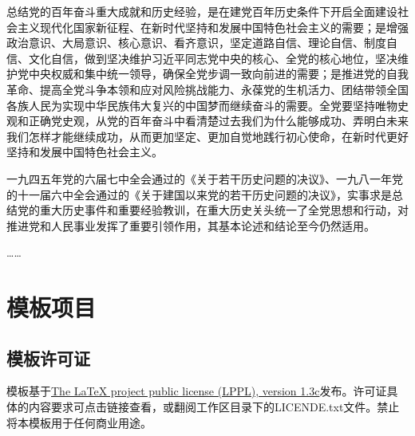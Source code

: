 \documentclass[12pt]{dlmuupcsrep}
\begin{document}
总结党的百年奋斗重大成就和历史经验，是在建党百年历史条件下开启全面建设社会主义现代化国家新征程、在新时代坚持和发展中国特色社会主义的需要；是增强政治意识、大局意识、核心意识、看齐意识，坚定道路自信、理论自信、制度自信、文化自信，做到坚决维护习近平同志党中央的核心、全党的核心地位，坚决维护党中央权威和集中统一领导，确保全党步调一致向前进的需要；是推进党的自我革命、提高全党斗争本领和应对风险挑战能力、永葆党的生机活力、团结带领全国各族人民为实现中华民族伟大复兴的中国梦而继续奋斗的需要。全党要坚持唯物史观和正确党史观，从党的百年奋斗中看清楚过去我们为什么能够成功、弄明白未来我们怎样才能继续成功，从而更加坚定、更加自觉地践行初心使命，在新时代更好坚持和发展中国特色社会主义。

一九四五年党的六届七中全会通过的《关于若干历史问题的决议》、一九八一年党的十一届六中全会通过的《关于建国以来党的若干历史问题的决议》，实事求是总结党的重大历史事件和重要经验教训，在重大历史关头统一了全党思想和行动，对推进党和人民事业发挥了重要引领作用，其基本论述和结论至今仍然适用。

……

\section{模板项目}

\subsection{模板许可证}

模板基于\href{https://www.latex-project.org/lppl/lppl-1-3c/}{The LaTeX project public license (LPPL), version 1.3c}发布。许可证具体的内容要求可点击链接查看，或翻阅工作区目录下的LICENDE.txt文件。禁止将本模板用于任何商业用途。
\end{document}
